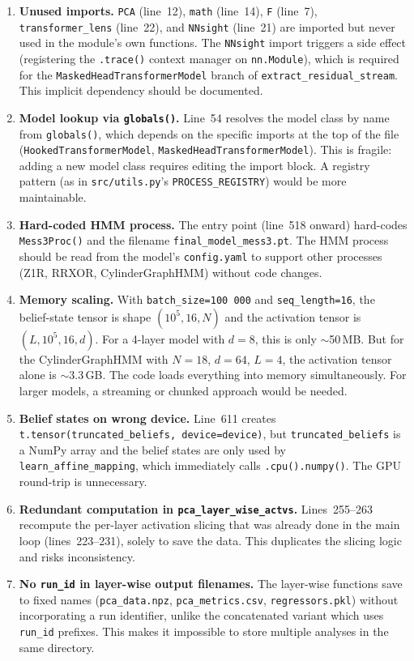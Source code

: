 \documentclass[11pt]{article}
\newcommand{\code}[1]{\texttt{#1}}
\newcommand{\file}[1]{\texttt{#1}}
\begin{document}
\begin{enumerate}
  \item \textbf{Unused imports.}  \code{PCA} (line~12), \code{math} (line~14), \code{F} (line~7), \code{transformer\_lens} (line~22), and \code{NNsight} (line~21) are imported but never used in the module's own functions.  The \code{NNsight} import triggers a side effect (registering the \code{.trace()} context manager on \code{nn.Module}), which is required for the \code{MaskedHeadTransformerModel} branch of \code{extract\_residual\_stream}.  This implicit dependency should be documented.

  \item \textbf{Model lookup via \code{globals()}.}  Line~54 resolves the model class by name from \code{globals()}, which depends on the specific imports at the top of the file (\code{HookedTransformerModel}, \code{MaskedHeadTransformerModel}).  This is fragile: adding a new model class requires editing the import block.  A registry pattern (as in \code{src/utils.py}'s \code{PROCESS\_REGISTRY}) would be more maintainable.

  \item \textbf{Hard-coded HMM process.}  The entry point (line~518 onward) hard-codes \code{Mess3Proc()} and the filename \code{final\_model\_mess3.pt}.  The HMM process should be read from the model's \file{config.yaml} to support other processes (Z1R, RRXOR, CylinderGraphHMM) without code changes. 

  \item \textbf{Memory scaling.}  With \code{batch\_size=100\,000} and \code{seq\_length=16}, the belief-state tensor is shape $(10^5, 16, N)$ and the activation tensor is $(L, 10^5, 16, d)$.  For a 4-layer model with $d = 8$, this is only $\sim$50\,MB.  But for the CylinderGraphHMM with $N = 18$, $d = 64$, $L = 4$, the activation tensor alone is $\sim$3.3\,GB.  The code loads everything into memory simultaneously.  For larger models, a streaming or chunked approach would be needed.

  \item \textbf{Belief states on wrong device.}  Line~611 creates \code{t.tensor(truncated\_beliefs, device=device)}, but \code{truncated\_beliefs} is a NumPy array and the belief states are only used by \code{learn\_affine\_mapping}, which immediately calls \code{.cpu().numpy()}.  The GPU round-trip is unnecessary.

  \item \textbf{Redundant computation in \code{pca\_layer\_wise\_actvs}.}  Lines~255--263 recompute the per-layer activation slicing that was already done in the main loop (lines~223--231), solely to save the data.  This duplicates the slicing logic and risks inconsistency.

  \item \textbf{No \code{run\_id} in layer-wise output filenames.}  The layer-wise functions save to fixed names (\file{pca\_data.npz}, \file{pca\_metrics.csv}, \file{regressors.pkl}) without incorporating a run identifier, unlike the concatenated variant which uses \code{run\_id} prefixes.  This makes it impossible to store multiple analyses in the same directory.
\end{enumerate}
\end{document}
